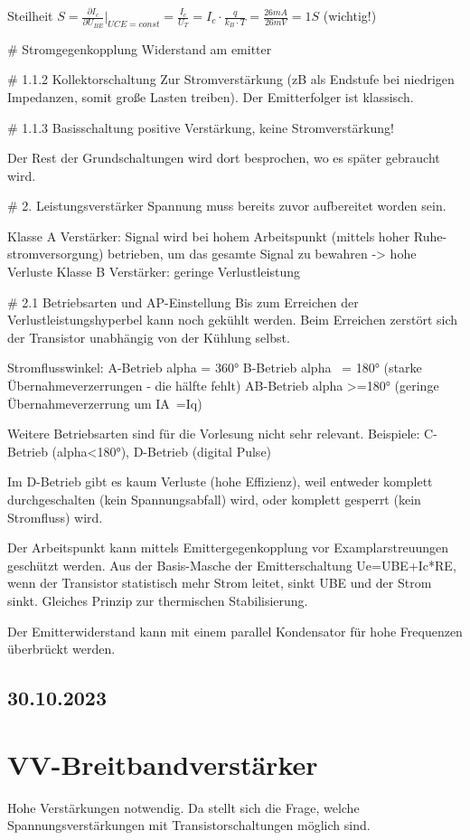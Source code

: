 \documentclass[a5paper]{article}
\begin{document}
Steilheit $S=\frac{\partial I_{c}}{\partial U_{BE}} |_{UCE=const} = \frac{I_{c}}{U_{T}}=I_{c}\cdot \frac{q}{k_{B}\cdot T}=\frac{26mA}{26mV}=1S$ (wichtig!)

# Stromgegenkopplung
Widerstand am emitter

# 1.1.2 Kollektorschaltung
Zur Stromverstärkung (zB als Endstufe bei niedrigen Impedanzen, somit große Lasten treiben).
Der Emitterfolger ist klassisch.

# 1.1.3 Basisschaltung
positive Verstärkung, keine Stromverstärkung!

Der Rest der Grundschaltungen wird dort besprochen, wo es später gebraucht wird.

# 2. Leistungsverstärker
Spannung muss bereits zuvor aufbereitet worden sein.

Klasse A Verstärker: Signal wird bei hohem Arbeitspunkt (mittels hoher Ruhe-
stromversorgung) betrieben, um das gesamte Signal zu bewahren -> hohe Verluste
Klasse B Verstärker: geringe Verlustleistung

# 2.1 Betriebsarten und AP-Einstellung
Bis zum Erreichen der Verlustleistungshyperbel kann noch gekühlt werden.
Beim Erreichen zerstört sich der Transistor unabhängig von der Kühlung selbst.

Stromflusswinkel:
    A-Betrieb alpha = 360°
    B-Betrieb alpha ~= 180° (starke Übernahmeverzerrungen - die hälfte fehlt)
    AB-Betrieb alpha >=180° (geringe Übernahmeverzerrung um IA~=Iq)

Weitere Betriebsarten sind für die Vorlesung nicht sehr relevant.
Beispiele: C-Betrieb (alpha<180°), D-Betrieb (digital Pulse)

Im D-Betrieb gibt es kaum Verluste (hohe Effizienz), weil entweder komplett
durchgeschalten (kein Spannungsabfall) wird, oder komplett gesperrt (kein
Stromfluss) wird.

Der Arbeitspunkt kann mittels Emittergegenkopplung vor Examplarstreuungen
geschützt werden.
Aus der Basis-Masche der Emitterschaltung Ue=UBE+Ic*RE, wenn der 
Transistor statistisch mehr Strom leitet, sinkt UBE und der Strom sinkt.
Gleiches Prinzip zur thermischen Stabilisierung.

Der Emitterwiderstand kann mit einem parallel Kondensator für hohe Frequenzen
überbrückt werden.

\subsection*{30.10.2023}
\section*{VV-Breitbandverstärker}
Hohe Verstärkungen notwendig. Da stellt sich die Frage, welche Spannungsverstärkungen mit Transistorschaltungen möglich sind.
\end{document}
